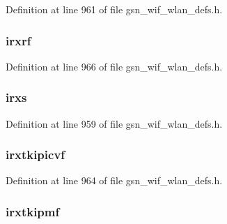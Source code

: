 Definition at line 961 of file gsn\_\-wif\_\-wlan\_\-defs.h.

\hypertarget{a00398_aa52813f94b376eda476184c012c45e88}{
\subsubsection[{irxrf}]{ {\bf irxrf}}}
\label{a00398_aa52813f94b376eda476184c012c45e88}


Definition at line 966 of file gsn\_\-wif\_\-wlan\_\-defs.h.

\hypertarget{a00398_a9d7a88c240dec187f668e734cdd72e74}{
\subsubsection[{irxs}]{ {\bf irxs}}}
\label{a00398_a9d7a88c240dec187f668e734cdd72e74}


Definition at line 959 of file gsn\_\-wif\_\-wlan\_\-defs.h.

\hypertarget{a00398_ab099589c8ae324e0f931459d5a979732}{
\subsubsection[{irxtkipicvf}]{ {\bf irxtkipicvf}}}
\label{a00398_ab099589c8ae324e0f931459d5a979732}


Definition at line 964 of file gsn\_\-wif\_\-wlan\_\-defs.h.

\hypertarget{a00398_a0bfc3871c452bfdda6a9b976bb03b641}{
\subsubsection[{irxtkipmf}]{ {\bf irxtkipmf}}}
\label{a00398_a0bfc3871c452bfdda6a9b976bb03b641}


